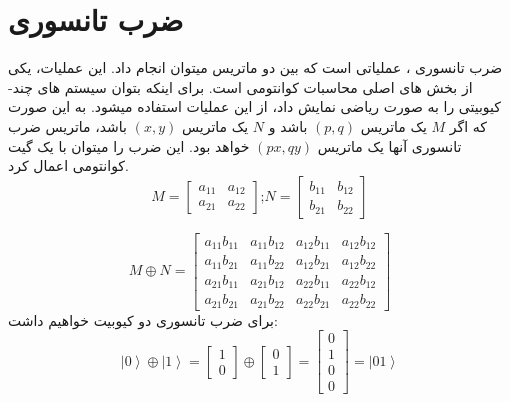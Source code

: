 \section{ضرب تانسوری}
ضرب تانسوری
، عملیاتی است که بین دو ماتریس میتوان انجام داد. این عملیات، یکی از بخش های اصلی محاسبات کوانتومی است. برای اینکه بتوان سیستم های چند-کیوبیتی
را به صورت ریاضی نمایش داد، از این عملیات استفاده میشود. به این صورت که اگر $M$ یک ماتریس $(p,q)$ باشد و  $N$ یک ماتریس $(x,y)$ باشد، ماتریس ضرب تانسوری آنها یک ماتریس $(px,qy)$ خواهد بود. 
\cite{fundamentalsandapplications}
این ضرب را میتوان با یک گیت کوانتومی
 اعمال کرد.
\begin{equation}
M =  \begin{bmatrix}
 a_{11} &  a_{12}
\\
 a_{21} & a_{22}
\end{bmatrix}
\text{;}
N =  \begin{bmatrix}
 b_{11} &  b_{12}
\\
 b_{21} &  b_{22}
\end{bmatrix}
\end{equation}

\begin{equation}
M \oplus  N =  \begin{bmatrix}
 a_{11}b_{11} &  a_{11}b_{12} &  a_{12}b_{11} &  a_{12}b_{12}
\\
 a_{11}b_{21} &  a_{11}b_{22} &  a_{12}b_{21} &  a_{12}b_{22}
\\
 a_{21}b_{11} &  a_{21}b_{12} &  a_{22}b_{11} &  a_{22}b_{12}
\\
 a_{21}b_{21} &  a_{21}b_{22} &  a_{22}b_{21} &  a_{22}b_{22}
\end{bmatrix}
\end{equation}
برای ضرب تانسوری دو کیوبیت خواهیم داشت:
\begin{equation}
\left|0\right\rangle  \oplus  \left|1\right\rangle  =
\begin{bmatrix}
1 \\ 0 
\end{bmatrix} 
\oplus 
\begin{bmatrix}
0 \\ 1 
\end{bmatrix} 
=
  \begin{bmatrix}
0
\\
1
\\
0
\\
0
\end{bmatrix} = \left|01\right\rangle
\end{equation}

